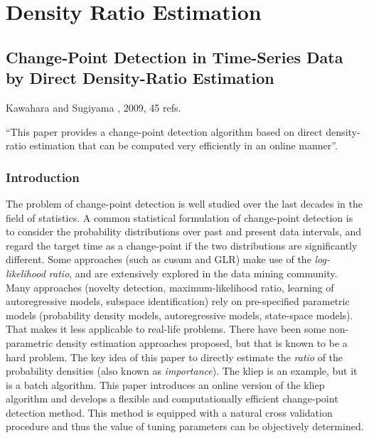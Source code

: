 \section{Density Ratio Estimation}

\subsection{Change-Point Detection in Time-Series Data by Direct Density-Ratio Estimation}
Kawahara and Sugiyama \cite{kawahara2009change}, 2009, 45 refs.

``This paper provides a change-point detection algorithm based on direct density-ratio estimation that can be computed very efficiently in an online manner''.

\subsubsection{Introduction}
The problem of change-point detection is well studied over the last decades in the field of statistics.
A common statistical formulation of change-point detection is to consider the probability distributions over past and present data intervals, and regard the target time as a change-point if the two distributions are significantly different.
Some approaches (such as \gls{cusum} and GLR) make use of the \emph{log-likelihood ratio}, and are extensively explored in the data mining community.
Many approaches (novelty detection, maximum-likelihood ratio, learning of autoregressive models, subspace identification) rely on pre-specified parametric models (probability density models, autoregressive models, state-space models).
That makes it less applicable to real-life problems.
There have been some non-parametric density estimation approaches proposed, but that is known to be a hard problem.
The key idea of this paper to directly estimate the \emph{ratio} of the probability densities (also known as \emph{importance}).
The \gls{kliep} is an example, but it is a batch algorithm.
This paper introduces an online version of the \gls{kliep} algorithm and develops a flexible and computationally efficient change-point detection method.
This method is equipped with a natural cross validation procedure and thus the value of tuning parameters can be objectively determined.

